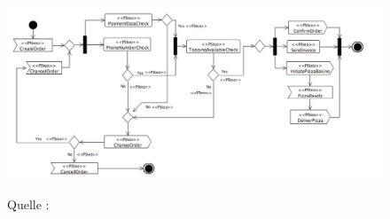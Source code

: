 \begin{center}
\begin{figure}[h]
   

\includegraphics[scale= 0.65]{Graphics/activitydiagram.jpg} 



Quelle : \cite{MT005}

\label{fig4}


\end{figure}
\end{center}

\newpage
